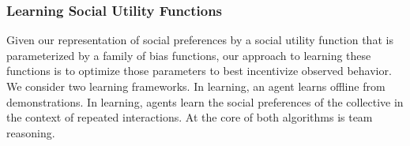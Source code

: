 
\subsubsection*{\large Learning Social Utility Functions}
\label{sec:learning}

Given our representation of social preferences by a social utility
function that is parameterized by a family of bias functions, our
approach to learning these functions is to optimize those parameters
to best incentivize observed behavior.  We consider two learning
frameworks.  In  learning, an agent learns offline from
demonstrations.  In  learning, agents learn the
social preferences of the collective in the context of repeated
interactions.
%
At the core of both algorithms is team reasoning.



